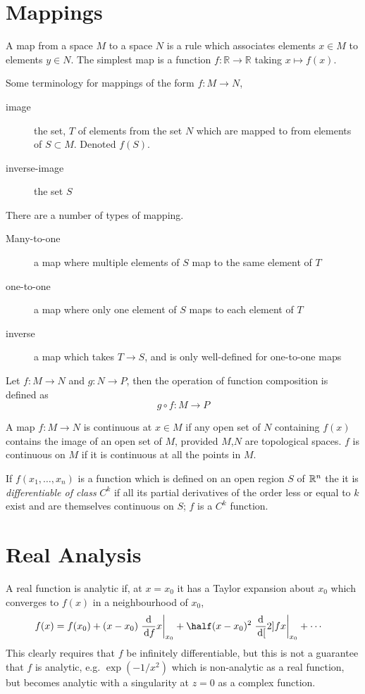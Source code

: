 \section{Mappings}
\label{sec:mappings}

A map from a space $M$ to a space $N$ is a rule which associates
elements $x \in M$ to elements $y \in N$. The simplest map is a
function $f:\mathbb{R} \to \mathbb{R}$ taking $x \mapsto f(x)$. 

Some terminology for mappings of the form $f:M \to N$,
\begin{description}
\item[image] the set, $T$ of elements from the set $N$ which are mapped to from elements of $S \subset M$. Denoted $f(S)$.
\item[inverse-image] the set $S$
\end{description}
There are a number of types of mapping.
\begin{description}
\item[Many-to-one] a map where multiple elements of $S$ map to the same element of $T$ 
\item[one-to-one] a map where only one element of $S$ maps to each element of $T$
\item[inverse] a map which takes $T \to S$, and is only well-defined for one-to-one maps
\end{description}

Let $f:M \to N$ and $g: N \to P$, then the operation of function composition is defined as 
\[ g \circ f : M \to P \]

A map $f:M \to N$ is continuous at $x \in M$ if any open set of $N$
containing $f(x)$ contains the image of an open set of $M$, provided
$M$,$N$ are topological spaces. $f$ is continuous on $M$ if it is continuous at all the points in $M$.

If $f(x_1, \dots, x_n)$ is a function which is defined on an open
region $S$ of $\mathbb{R}^n$ the it is \emph{differentiable of class} $C^k$ if
all its partial derivatives of the order less or equal to $k$ exist
and are themselves continuous on $S$; $f$ is a $C^k$ function.

\section{Real Analysis}
\label{sec:real-analysis}

A real function is analytic if, at $x=x_0$ it has a Taylor expansion
about $x_0$ which converges to $f(x)$ in a neighbourhood of $x_0$,
{\small
\begin{align}
  \label{eq:2}
  f(x) &= f(x_0) + (x-x_0) \eval{\dv{f}{x}}_{x_0} 
        + \half (x-x_0)^2 \eval{\dv[2]{f}{x}}_{x_0}
       + \cdots
\end{align}
} This clearly requires that $f$ be infinitely differentiable, but
this is not a guarantee that $f$ is analytic, e.g. $\exp(-1/x^2)$
which is non-analytic as a real function, but becomes analytic with a
singularity at $z=0$ as a complex function.

